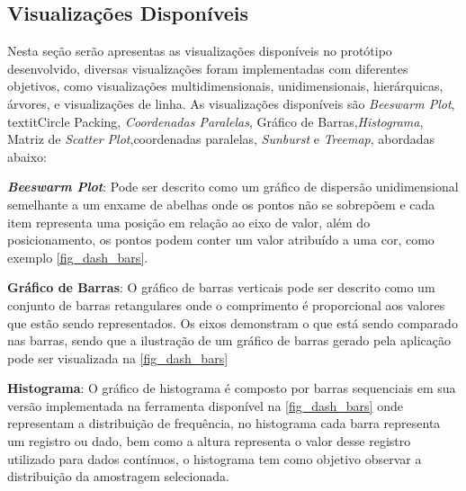 \documentclass[
	12pt,				%
	openright,			%
	oneside,			%
	a4paper,			%
	english,			%
	brazil				%
	]{abntex2}
\begin{document}
\subsection{Visualizações Disponíveis}
Nesta seção serão apresentas as visualizações disponíveis no protótipo desenvolvido, diversas visualizações foram implementadas com diferentes objetivos, como visualizações multidimensionais, unidimensionais, hierárquicas, árvores, e visualizações de linha. As visualizações disponíveis são \textit{Beeswarm Plot}, textit{Circle Packing}, \textit{Coordenadas Paralelas}, Gráfico de Barras,\textit{Histograma}, Matriz de \textit{Scatter Plot},coordenadas paralelas, \textit{Sunburst} e \textit{Treemap}, abordadas abaixo: 

\textbf{\textit{Beeswarm Plot}}:
    Pode ser descrito como um gráfico de dispersão unidimensional semelhante a um enxame de abelhas onde os pontos não se sobrepõem e cada item representa uma posição em relação ao eixo de valor, além do posicionamento, os pontos podem conter um valor atribuído a uma cor, como exemplo \autoref{fig_dash_bars}.
    
\textbf{Gráfico de Barras}:
    O gráfico de barras verticais pode ser descrito como um conjunto de barras retangulares onde o comprimento é proporcional aos valores que estão sendo representados. Os eixos demonstram o que está sendo comparado nas barras, sendo que a ilustração de um gráfico de barras gerado pela aplicação pode ser visualizada na \autoref{fig_dash_bars}
    
\textbf{Histograma}:
    O gráfico de histograma é composto por barras sequenciais em sua versão implementada na ferramenta disponível na \autoref{fig_dash_bars} onde representam a distribuição de frequência, no histograma cada barra representa um registro ou dado, bem como a altura representa o valor desse registro utilizado para dados contínuos, o histograma tem como objetivo observar a distribuição da amostragem selecionada.
    
\end{document}
